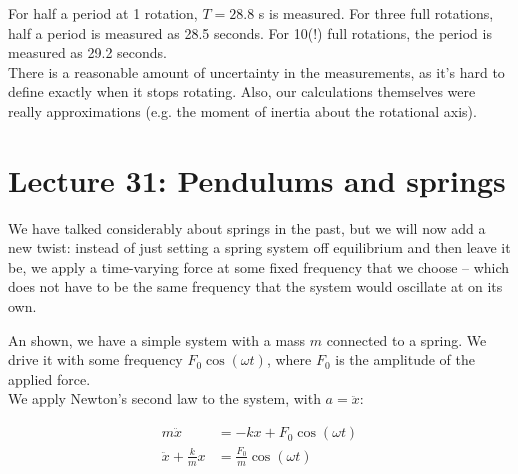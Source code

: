 For half a period at 1 rotation, $T = 28.8$ s is measured. For three full rotations, half a period is measured as 28.5 seconds. For 10(!) full rotations, the period is measured as 29.2 seconds.\\
There is a reasonable amount of uncertainty in the measurements, as it's hard to define exactly when it stops rotating. Also, our calculations themselves were really approximations (e.g. the moment of inertia about the rotational axis).

\section{Lecture 31: Pendulums and springs}

We have talked considerably about springs in the past, but we will now add a new twist: instead of just setting a spring system off equilibrium and then leave it be, we apply a time-varying force at some fixed frequency that we choose -- which does not have to be the same frequency that the system would oscillate at on its own.

\begin{figure}[H]
  \centering
{}
\caption{}
\end{figure}



An shown, we have a simple system with a mass $m$ connected to a spring. We drive it with some frequency $F_0 \cos (\omega t)$, where $F_0$ is the amplitude of the applied force.\\
We apply Newton's second law to the system, with $a = \ddot{x}$:

\begin{align}
m \ddot{x} &= - k x + F_0 \cos (\omega t)\\
\ddot{x} + \frac{k}{m} x &=  \frac{F_0}{m} \cos (\omega t)
\end{align}

